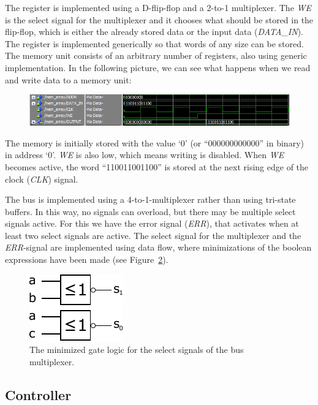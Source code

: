\documentclass[a4,11pt]{article}
\begin{document}
The register is implemented using a D-flip-flop and a 2-to-1 multiplexer. The {\it WE} is the select
signal for the multiplexer and it chooses what should be stored in the flip-flop, which is either
the already stored data or the input data ({\it DATA\_IN}). The register is implemented
generically so that words of any size can be stored. The memory unit consists of an arbitrary number
of registers, also using generic implementation. In the following picture, we can see what happens
when we read and write data to a memory unit:

\begin{figure}[h!]
	\centering
	\includegraphics[width=1\textwidth]{Figurer/data_memory}
	\label{fig:sim}
\end{figure}

The memory is initially stored with the value `0' (or ``000000000000'' in binary) in address `0'.
{\it WE} is also low, which means writing is disabled. When {\it WE} becomes active, the word
``110011001100'' is stored at the next rising edge of the clock ({\it CLK}) signal.

The bus is implemented using a 4-to-1-multiplexer rather than using tri-state buffers. In this
way, no signals can overload, but there may be multiple select signals active. For this we have
the error signal ({\it ERR}), that activates when at least two select signals are active. The
select signal for the multiplexer and the {\it ERR}-signal are implemented using data flow, where
minimizations of the boolean expressions have been made (see Figure~\ref{fig:enc}).

\begin{figure}[h!]
	\centering
	\includegraphics[width=.3\textwidth]{Figurer/enc4b}
	\caption{The minimized gate logic for the select signals of the bus multiplexer.}
	\label{fig:enc}
\end{figure}

\subsection{Controller}
\end{document}
